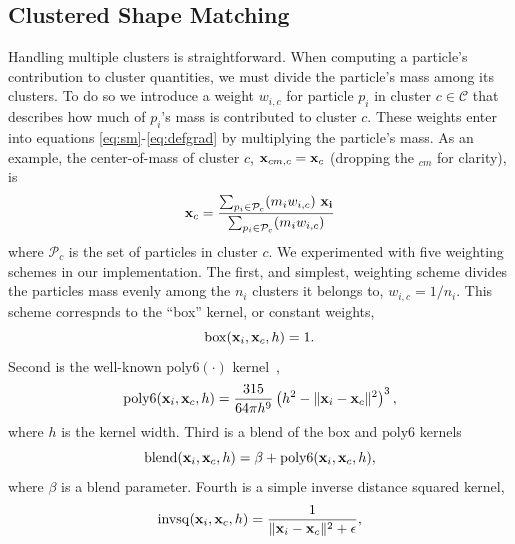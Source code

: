\documentclass[review]{acmsiggraph}
\begin{document}
\subsection{Clustered Shape Matching}
Handling multiple clusters is straightforward.  When computing a particle's contribution to 
cluster quantities, we must divide the particle's mass among its clusters.  To do 
so we introduce a weight $w_{i,c}$ for particle $p_i$ in cluster $c\in\mathcal{C}$ that describes how much of
$p_i$'s mass is contributed to cluster $c$.  These weights enter into equations \eqref{eq:sm}-\eqref{eq:defgrad} by multiplying
the particle's mass.  As an example, the center-of-mass of cluster $c$, $\mathit{\mathbf{x}}_{cm,c} = \mathit{\mathbf{x}}_{c}$ (dropping the $_{cm}$ for clarity), is
\begin{equation}
\label{eq:com}
\B{x}_{c} = \frac{\sum_{p_i\in\mathcal{P}_c}(m_iw_{i,c})~\B{x_i}}{\sum_{p_i\in\mathcal{P}_c}(m_iw_{i,c})}%
\end{equation}
where $\mathcal{P}_c$ is the set of particles in cluster $c$.
We experimented with five weighting schemes in our implementation.  The first, and simplest, weighting
scheme divides the particles mass evenly among the $n_i$ clusters it belongs to, $w_{i,c} = 1/n_i$.
This scheme correspnds to the ``box'' kernel, or constant weights,
\begin{equation}
\label{eq:box}
\mathrm{box}(\mathit{\mathbf{x}}_i, \mathit{\mathbf{x}}_{c}, h) = 1.
\end{equation}
Second is the well-known $\mathrm{poly6}(\cdot)$ kernel~\cite{Mueller:2003:PFS},
\begin{equation}
\label{eq:poly6}
\mathrm{poly6}(\mathit{\mathbf{x}}_i, \mathit{\mathbf{x}}_{c}, h) = \frac{315}{64\pi h^9}\left(h^2-\|\mathit{\mathbf{x}}_i-\mathit{\mathbf{x}}_{c}\|^2\right)^3,
\end{equation}
where $h$ is the kernel width.
Third is a blend of the $\mathrm{box}$ and $\mathrm{poly6}$ kernels
\begin{equation}
\label{blend}
\mathrm{blend}(\mathit{\mathbf{x}}_i, \mathit{\mathbf{x}}_{c}, h) = \beta + \mathrm{poly6}(\mathit{\mathbf{x}}_i, \mathit{\mathbf{x}}_{c}, h),
\end{equation}
where $\beta$ is a blend parameter.
Fourth is a simple inverse distance squared kernel,
\begin{equation}
\label{eq:invdistancesquared}
\mathrm{invsq}(\mathit{\mathbf{x}}_i, \mathit{\mathbf{x}}_{c}, h) = \frac{1}{\|\mathit{\mathbf{x}}_i-\mathit{\mathbf{x}}_{c}\|^2+\epsilon},
\end{equation}
\end{document}
